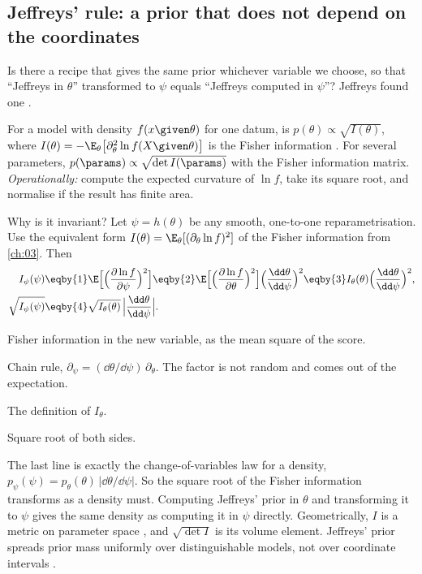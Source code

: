 \subsection{Jeffreys' rule: a prior that does not depend on the coordinates}

Is there a recipe that gives the same prior whichever variable we choose, so that
``Jeffreys in $\theta$'' transformed to $\psi$ equals ``Jeffreys computed in $\psi$''?
Jeffreys found one .

\begin{workdef}
For a model with density $f(x\given\theta)$ for one datum, 
is $p(\theta)\propto\sqrt{I(\theta)}$, where $I(\theta)=-\E_\theta\bigl[\partial_\theta^2
\ln f(X\given\theta)\bigr]$ is the Fisher information . For several parameters,
$p(\params)\propto\sqrt{\det I(\params)}$ with the Fisher information matrix.
\emph{Operationally:} compute the expected curvature of $\ln f$, take its square root,
and normalise if the result has finite area.
\end{workdef}

Why is it invariant? Let $\psi=h(\theta)$ be any smooth, one-to-one reparametrisation.
Use the equivalent form $I(\theta)=\E_\theta[(\partial_\theta\ln f)^2]$ of the Fisher
information from \cref{ch:03}. Then
\begin{align*}
  I_\psi(\psi)
  &\eqby{1}\E\Bigl[\Bigl(\frac{\partial\ln f}{\partial\psi}\Bigr)^2\Bigr]
   \eqby{2}\E\Bigl[\Bigl(\frac{\partial\ln f}{\partial\theta}\Bigr)^2\Bigr]
     \Bigl(\frac{\dd\theta}{\dd\psi}\Bigr)^2
   \eqby{3}I_\theta(\theta)\Bigl(\frac{\dd\theta}{\dd\psi}\Bigr)^2,
  \\
  \sqrt{I_\psi(\psi)}
  &\eqby{4}\sqrt{I_\theta(\theta)}\,\Bigl|\frac{\dd\theta}{\dd\psi}\Bigr| .
\end{align*}
\begin{explain}
  \item Fisher information in the new variable, as the mean square of the score.
  \item Chain rule, $\partial_\psi=(\dd\theta/\dd\psi)\,\partial_\theta$. The factor is
        not random and comes out of the expectation.
  \item The definition of $I_\theta$.
  \item Square root of both sides.
\end{explain}
The last line is exactly the change-of-variables law for a density,
$p_\psi(\psi)=p_\theta(\theta)\,|\dd\theta/\dd\psi|$. So the square root of the Fisher
information transforms as a density must. Computing Jeffreys' prior in $\theta$ and
transforming it to $\psi$ gives the same density as computing it in $\psi$ directly. Geometrically, $I$ is a metric on parameter space
, and
$\sqrt{\det I}$ is its volume element. Jeffreys' prior spreads prior mass uniformly
over distinguishable models, not over coordinate intervals
.

